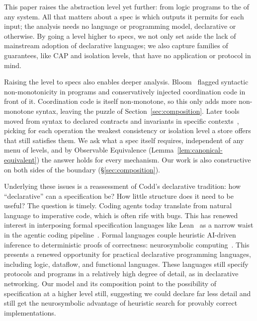 This paper raises the abstraction level yet further: from logic programs to the
\spectype[s] of any system. All that matters about a spec is which outputs it
permits for each input; the analysis needs no language or programming model,
declarative or otherwise. By going a level higher to specs, we not only set
aside the lack of mainstream adoption of declarative languages; we also capture
families of guarantees, like CAP and isolation levels, that have no application
or protocol in mind.

Raising the level to specs also enables deeper analysis.
Bloom~\cite{alvaro2011bloom} flagged syntactic non-monotonicity in programs and
conservatively injected coordination code in front of it. Coordination code is
itself non-monotone, so this only adds more non-monotone syntax, leaving the
puzzle of Section~\ref{sec:composition}. Later tools moved from syntax to
declared contracts and invariants in specific
contexts~\cite{sivaramakrishnan2015quelea,kaki2018alone}, picking for each
operation the weakest consistency or isolation level a store offers that still
satisfies them. We ask what a spec itself requires, independent of any menu of
levels, and by Observable Equivalence (Lemma~\ref{lem:canonical-equivalent}) the
answer holds for every mechanism. Our work is also constructive on both sides of the
boundary (\S\ref{sec:composition}).

Underlying these issues is a reassessment of Codd's declarative tradition: how
``declarative'' can a specification be? How little structure does it need to be
useful? The question is timely. Coding agents today translate from natural
language to imperative code, which is often rife with bugs. This has renewed
interest in interposing formal specification languages like
Lean~\cite{demoura2021lean4} as a narrow waist in the agentic coding pipeline~\cite{hellerstein2023codd}.
Formal languages couple heuristic
AI-driven inference to deterministic proofs of correctness: neurosymbolic
computing~\cite{an2025neurosymbolic}. This presents a renewed
opportunity for practical declarative programming languages, including logic,
dataflow, and functional languages. These languages still specify protocols and
programs in a relatively high degree of detail, as in declarative networking.
Our \spectype[] model and its composition point to the possibility of
specification at a higher level still, suggesting we could declare far less detail
and still get the neurosymbolic advantage of heuristic search for
provably correct implementations.
